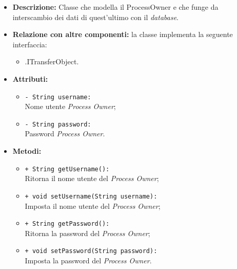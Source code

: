 \begin{flushleft}
\begin{itemize}
\item \textbf{Descrizione:} Classe che modella il ProcessOwner e che funge da interscambio dei dati di quest'ultimo con il \textit{database}.
\item \textbf{Relazione con altre componenti:} la classe implementa la seguente interfaccia:
		\begin{itemize}
			\item \smodel{}.ITransferObject.
		\end{itemize}
\item \textbf{Attributi:}
\begin{sloppypar}
\begin{itemize}
\item \texttt{- String username:}\\ Nome utente \textit{Process Owner};
\item \texttt{- String password:}\\ Password \textit{Process Owner}.
\end{itemize}
\end{sloppypar}
\item \textbf{Metodi:}
\begin{sloppypar}
\begin{itemize}
\item \texttt{+ String getUsername():}\\ Ritorna il nome utente del \textit{Process Owner};
\item \texttt{+ void setUsername(String username):}\\ Imposta il nome utente del \textit{Process Owner};
\item \texttt{+ String getPassword():}\\ Ritorna la password del \textit{Process Owner};
\item \texttt{+ void setPassword(String password):}\\ Imposta la password del \textit{Process Owner}. 
\end{itemize}
\end{sloppypar}
\end{itemize}
\end{flushleft}

